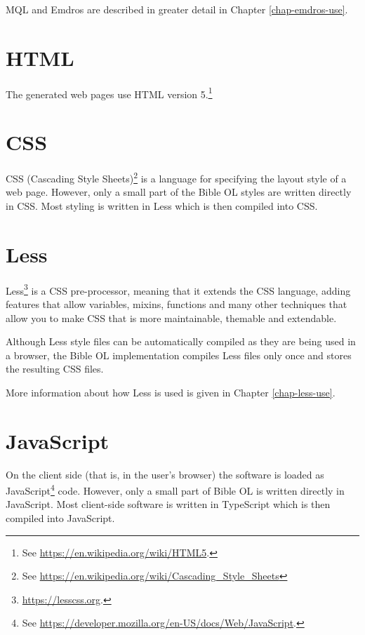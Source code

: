 \documentclass[11pt,oneside,a4paper]{memoir}
\begin{document}
MQL and Emdros are described in greater detail in Chapter \ref{chap-emdros-use}.



\section{HTML}

The generated web pages use HTML version 5.\footnote{See \url{https://en.wikipedia.org/wiki/HTML5}.}


\section{CSS}\label{sec-css}

CSS (Cascading Style Sheets)\footnote{See
  \url{https://en.wikipedia.org/wiki/Cascading_Style_Sheets}} is a language for specifying the
layout style of a web page. However, only a small part of the Bible OL styles are written directly
in CSS. Most styling is written in Less which is then compiled into CSS.


\section{Less}\label{sec-less}

Less\footnote{\url{https://lesscss.org}.} is a CSS pre-processor, meaning that it
extends the CSS language, adding features that allow variables, mixins, functions and many other
techniques that allow you to make CSS that is more maintainable, themable and extendable.

Although Less style files can be automatically compiled as they are being used in a browser, the
Bible OL implementation compiles Less files only once and stores the resulting CSS files.

More information about how Less is used is given in Chapter \ref{chap-less-use}.

\section{JavaScript}

On the client side (that is, in the user's browser) the software is loaded as
JavaScript\footnote{See \url{https://developer.mozilla.org/en-US/docs/Web/JavaScript}.} code.
However, only a small part of Bible OL is written directly in JavaScript. Most client-side software
is written in TypeScript which is then compiled into JavaScript.
\end{document}
